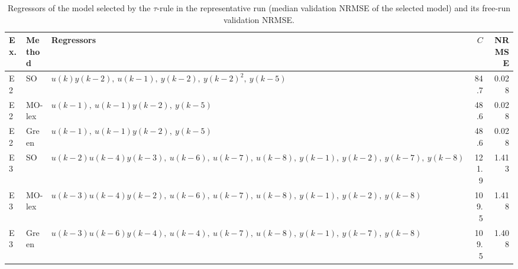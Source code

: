 \begin{table}[t]
\centering
\caption{Regressors of the model selected by the $\tau$-rule in the representative run (median validation NRMSE of the selected model) and its free-run validation NRMSE.}
\label{tab:models_K}
\setlength{\tabcolsep}{3pt}
\footnotesize
\begin{tabular}{llp{8.5cm}rr}
\toprule
Ex. & Method & Regressors & $C$ & NRMSE \\
\midrule
E2 & SO & $u(k) y(k-2),\ u(k-1),\ y(k-2),\ y(k-2)^{2},\ y(k-5)$ & 84.7 & 0.028 \\
E2 & MO-lex & $u(k-1),\ u(k-1) y(k-2),\ y(k-5)$ & 48.6 & 0.028 \\
E2 & Green & $u(k-1),\ u(k-1) y(k-2),\ y(k-5)$ & 48.6 & 0.028 \\
\midrule
E3 & SO & $u(k-2) u(k-4) y(k-3),\ u(k-6),\ u(k-7),\ u(k-8),\ y(k-1),\ y(k-2),\ y(k-7),\ y(k-8)$ & 121.9 & 1.413 \\
E3 & MO-lex & $u(k-3) u(k-4) y(k-2),\ u(k-6),\ u(k-7),\ u(k-8),\ y(k-1),\ y(k-2),\ y(k-8)$ & 109.5 & 1.418 \\
E3 & Green & $u(k-3) u(k-6) y(k-4),\ u(k-4),\ u(k-7),\ u(k-8),\ y(k-1),\ y(k-7),\ y(k-8)$ & 109.5 & 1.408 \\
\bottomrule
\end{tabular}
\end{table}
